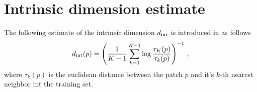 \documentclass{article}
\begin{document}
\section{Intrinsic dimension estimate}

The following estimate of the intrinsic dimension $d_{\rm int}$ is introduced in \cite{Levina:2004} as follows
\begin{align}
	d_{\rm int}(p) = \left( \frac{1}{K-1} \sum_{k=1}^{K-1}\log \frac{\tau_K(p)}{\tau_k(p)} \right)^{-1} \, ,
\end{align}
where $\tau_k(p)$ is the euclidean distance between the patch $p$ and it's $k$-th nearest neighbor int  the training set.
\end{document}
